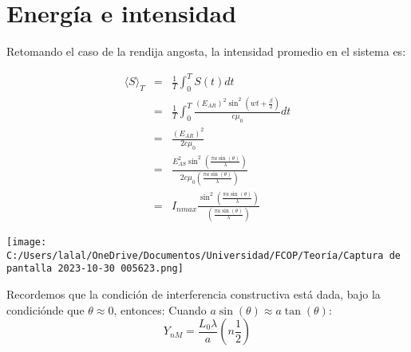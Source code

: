 \documentclass{article}
\begin{document}
        \section{Energía e intensidad}
        Retomando el caso de la rendija angosta, la intensidad 
        promedio en el sistema es:

        \begin{eqnarray}
            \langle S \rangle_T &=& 
            \frac{1}{T} \int_{0}^{T} S(t)dt\\
            &=& \frac{1}{T} \int_{0}^{T}
            \frac{(E_{AR})^2\sin^2(wt+\frac{\beta}{2})}{c\mu_0}dt\\
            &=& \frac{(E_{AR})^2}{2c\mu_0}\\
            &=& \frac{E_{AS}^2\sin^2(\frac{\pi a\sin(\theta)}{\lambda})}
            {2c\mu_0(\frac{\pi a \sin(\theta)}{\lambda})}\\
            &=& I_{nmax} \frac{\sin^2(\frac{\pi a \sin(\theta)}{\lambda})}
            {(\frac{\pi a \sin(\theta)}{\lambda})}    
        \end{eqnarray}


        \texttt{[image: C:/Users/lalal/OneDrive/Documentos/Universidad/FCOP/Teoría/Captura de pantalla 2023-10-30 005623.png]}
        
    Recordemos que la condición de interferencia constructiva está 
    dada, bajo la condiciónde que $\theta \approx 0$, entonces:
    Cuando $a\sin(\theta) \approx a\tan(\theta)$:
    \[
        Y_{nM} = \frac{L_0\lambda}{a} \left(n  \frac{1}{2}\right)    
    \]

        
\end{document}
